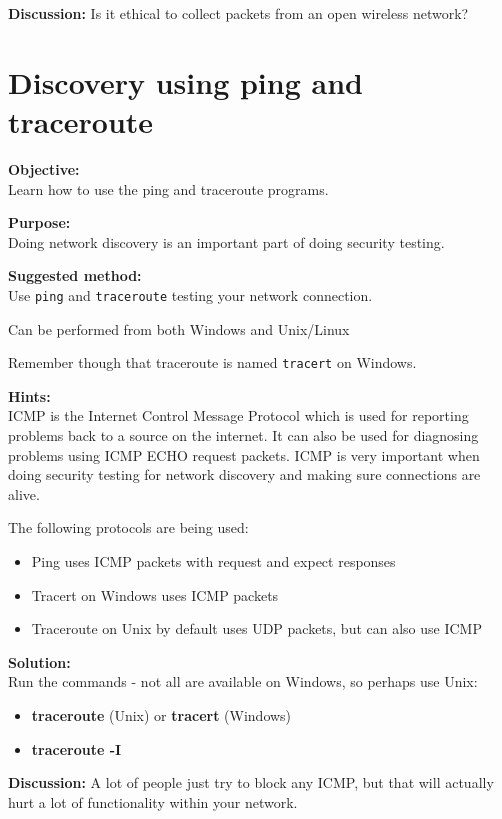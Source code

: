 \documentclass[a4paper,11pt,notitlepage]{report}
\begin{document}
{\bf Discussion:}
Is it ethical to collect packets from an open wireless network?

\chapter{Discovery using ping and traceroute}
\label{ex:ping}

{\bf Objective:}\\
Learn how to use the ping and traceroute programs.

{\bf Purpose:}\\
Doing network discovery is an important part of doing security testing.

{\bf Suggested method:} \\
Use \verb+ping+ and \verb+traceroute+ testing your network connection.

Can be performed from both Windows and Unix/Linux

Remember though that traceroute is named \verb+tracert+ on Windows.

{\bf Hints:} \\
ICMP is the Internet Control Message Protocol which is used for reporting problems back to a source on the internet. It can also be used for diagnosing problems using ICMP ECHO request packets. ICMP is very important when doing security testing for network discovery and making sure connections are alive.

The following protocols are being used:
\begin{itemize}
\item Ping uses ICMP packets with request and expect responses
\item Tracert on Windows uses ICMP packets
\item Traceroute on Unix by default uses UDP packets, but can also use ICMP
\end{itemize}

{\bf Solution:}\\
Run the commands - not all are available on Windows, so perhaps use Unix:
\begin{itemize}
\item {\bf traceroute} (Unix) or {\bf tracert} (Windows)
\item {\bf traceroute -I}\\
\end{itemize}

{\bf Discussion:}
A lot of people just try to block any ICMP, but that will actually hurt a lot of functionality within your network.
\end{document}
